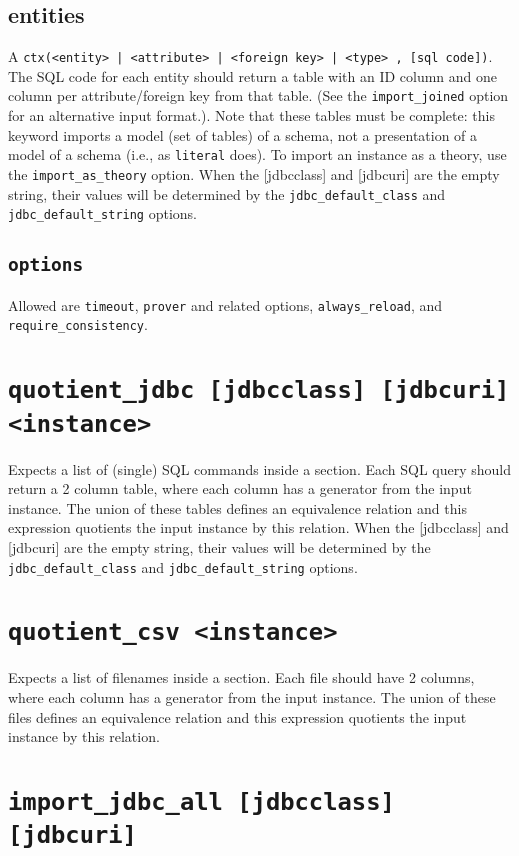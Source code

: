 \documentclass[10pt]{book}
\begin{document}
\subsection{entities}
A {\tt ctx(<entity> | <attribute> | <foreign key> | <type> , [sql code])}.  The SQL code for each entity should return a table with an ID column and one column per attribute/foreign key from that table.  (See the {\tt import\_joined} option for an alternative input format.). Note that these tables must be complete: this keyword imports a model (set of tables) of a schema, not a presentation of a model of a schema (i.e., as {\tt literal} does).  To import an instance as a theory, use the {\tt import\_as\_theory} option.  When the [jdbcclass] and [jdbcuri] are the empty string, their values will be determined by the {\tt jdbc\_default\_class} and {\tt jdbc\_default\_string} options.  

\subsection{{\tt options}}
Allowed are {\tt timeout}, {\tt prover} and related options, {\tt always\_reload}, and {\tt require\_consistency}.  


\section{{\tt quotient\_jdbc [jdbcclass] [jdbcuri] <instance>}}
Expects a list of (single) SQL commands inside a section.  Each SQL query should return a 2 column table, where each column has a generator from the input instance.  The union of these tables defines an equivalence relation and this expression quotients the input instance by this relation.  When the [jdbcclass] and [jdbcuri] are the empty string, their values will be determined by the {\tt jdbc\_default\_class} and {\tt jdbc\_default\_string} options.

\section{{\tt quotient\_csv <instance>}}
Expects a list of filenames inside a section.  Each file should have 2 columns, where each column has a generator from the input instance.  The union of these files defines an equivalence relation and this expression quotients the input instance by this relation. 

\section{{\tt import\_jdbc\_all [jdbcclass] [jdbcuri]}}
\end{document}
